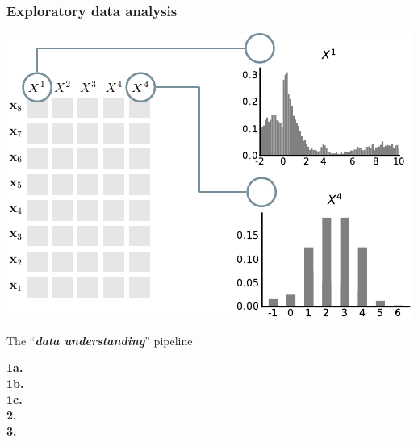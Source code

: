 \documentclass[xcolor={usenames,dvipsnames,svgnames}, compress, aspectratio=169, 11pt]{beamer}
\begin{document}
\begin{frame}[t, htt=bgrey2]
  \frametitle{Exploratory data analysis}
  \large
  \begin{minipage}[t]{0.6\linewidth}
    \vspace{5pt}
    \includegraphics[width=.9\linewidth]{figures/abda-hist-type}
  \end{minipage}\hfill\begin{minipage}[t]{0.4\linewidth}
    \vspace{10pt}
    {The ``\emph{\textbf{data understanding}}'' pipeline}\\[3pt]
    \raggedleft\begin{minipage}[t]{.9\linewidth}
      {\textbf{1a.} \\[-2pt]}
      {\textbf{1b.} \\[-2pt]}
      {\textbf{1c.}\hspace{1pt} \\[-2pt]}
      {\textbf{2.}\hspace{6pt} \\[-2pt]}
      {\textbf{3.}\hspace{6pt} \\[-2pt]}
    \end{minipage}    
  \end{minipage}  
\end{frame}
\end{document}
